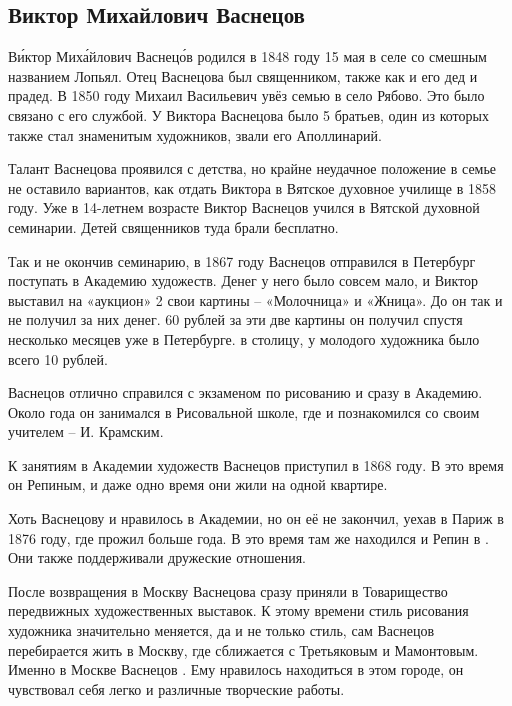 \subsection{Виктор Михайлович Васнецов}
В\'{и}ктор Мих\'{а}йлович Васнец\'{о}в родился в 1848 году 15 мая в селе со смешным названием Лопьял. Отец Васнецова был священником, также как и его дед и прадед. В 1850 году Михаил Васильевич увёз семью в село Рябово. Это было связано с его службой. У Виктора Васнецова было 5 братьев, один из которых также стал знаменитым художников, звали его Аполлинарий.

Талант Васнецова проявился с детства, но крайне неудачное  положение в семье не оставило вариантов, как отдать Виктора в Вятское духовное училище в 1858 году. Уже в 14-летнем возрасте Виктор Васнецов учился в Вятской духовной семинарии. Детей священников туда брали бесплатно.

Так и не окончив семинарию, в 1867 году Васнецов отправился в Петербург поступать в Академию художеств. Денег у него было совсем мало, и Виктор выставил на «аукцион» 2 свои картины -- «Молочница» и «Жница». До  он так и не получил за них денег. 60 рублей за эти две картины он получил спустя несколько месяцев уже в Петербурге.  в столицу, у молодого художника было всего 10 рублей.

Васнецов отлично справился с экзаменом по рисованию и сразу  в Академию. Около года он занимался в Рисовальной школе, где и познакомился со своим учителем -- И. Крамским.

К занятиям в Академии художеств Васнецов приступил в 1868 году. В это время он  Репиным, и даже одно время они жили на одной квартире.

Хоть Васнецову и нравилось в Академии, но он её не закончил, уехав в Париж в 1876 году, где прожил больше года. В это время там же находился и Репин в . Они также поддерживали дружеские отношения.

После возвращения в Москву Васнецова сразу приняли в Товарищество передвижных художественных выставок. К этому времени стиль рисования художника значительно меняется, да и не только стиль, сам Васнецов перебирается жить в Москву, где сближается с Третьяковым и Мамонтовым. Именно в Москве Васнецов . Ему нравилось находиться в этом городе, он чувствовал себя легко и  различные творческие работы.

